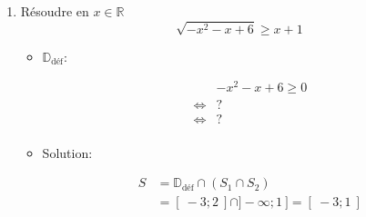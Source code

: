 \documentclass[
    11pt,
    a4paper,
    oneside,
    headinlcude, footinclude,
    twoside,
]{report}
\begin{document}
\begin{enumerate}
    \item  Résoudre en $x \in \mathbb{R}$
        $$\sqrt{- x^{2} -x + 6} \geq x+1$$

        \begin{itemize}
            \item $\mathbb{D}_{\text{déf}}:$

                \[
                    \begin{split}
                        &-x^{2} - x + 6 \geq 0\\
                        \iff &? \\ %
                        \iff &? \\
                    \end{split}
                \]

            \item Solution:

                \[
                    \begin{split}
                        S &= \mathbb{D}_{\text{déf}} \cap (S_{1} \cap S_{2})\\
                        &= [\ -3; 2 \ ] \cap ]-\infty; 1\ ] = [\ -3; 1\ ]
                    \end{split}
                \]
        \end{itemize}

\end{enumerate}


\end{document}
